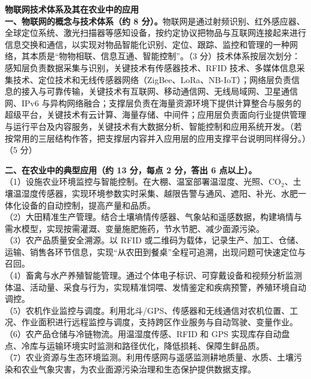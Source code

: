 \documentclass[a4paper,11pt]{article}
\begin{document}
\newpage
{}

\q \textbf{物联网技术体系及其在农业中的应用}\\
\textbf{一、物联网的概念与技术体系（约 8 分）。}物联网是通过射频识别、红外感应器、全球定位系统、激光扫描器等感知设备，按约定协议把物品与互联网连接起来进行信息交换和通信，以实现对物品智能化识别、定位、跟踪、监控和管理的一种网络，其本质是“物物相联、信息互通、智能控制”。（3 分）技术体系按层次划分：感知层负责数据采集与识别，关键技术有传感器技术、RFID 技术、多媒体信息采集技术、定位技术和无线传感器网络（ZigBee、LoRa、NB-IoT）；网络层负责信息的接入与可靠传输，关键技术有互联网、移动通信网、无线局域网、卫星通信网、IPv6 与异构网络融合；支撑层负责在海量资源环境下提供计算整合与服务的超级平台，关键技术有云计算、海量存储、中间件；应用层负责面向行业提供管理与运行平台及内容服务，关键技术有大数据分析、智能控制和应用系统开发。（若按常用的三层结构作答，把支撑层内容并入应用层的应用支撑平台说明同样得分。）（5 分）

\textbf{二、在农业中的典型应用（约 13 分，每点 2 分，答出 6 点以上）。}\\
（1）设施农业环境监控与智能控制。在大棚、温室部署温湿度、光照、CO$_2$、土壤温湿度传感器，实现环境参数实时采集、越限告警与通风、遮阳、补光、水肥一体化设备的自动控制，提高产量和品质。\\
（2）大田精准生产管理。结合土壤墒情传感器、气象站和遥感数据，构建墒情与需水模型，实现按需灌溉、变量施肥施药，节水节肥、减少面源污染。\\
（3）农产品质量安全溯源。以 RFID 或二维码为载体，记录生产、加工、仓储、运输、销售各环节信息，实现“从农田到餐桌”全程可追溯，出现问题可快速定位与召回。\\
（4）畜禽与水产养殖智能管理。通过个体电子标识、可穿戴设备和视频分析监测体温、活动量、采食与行为，实现精准饲喂、发情鉴定和疾病预警，养殖环境自动调控。\\
（5）农机作业监控与调度。利用北斗/GPS、传感器和无线通信对农机位置、工况、作业面积进行远程监控与调度，支持跨区作业服务与自动驾驶、变量作业。\\
（6）农产品仓储与冷链物流。用温湿度传感、RFID 和 GPS 实现库存自动盘点、冷库与运输环境实时监测和路径优化，降低损耗、保障生鲜品质。\\
（7）农业资源与生态环境监测。利用传感网与遥感监测耕地质量、水质、土壤污染和农业气象灾害，为农业面源污染治理和生态保护提供数据支撑。
\end{document}
